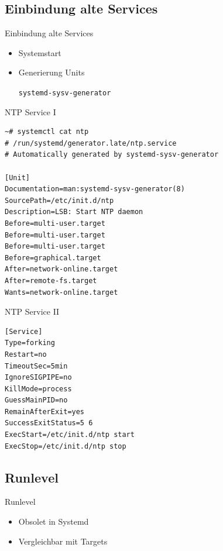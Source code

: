 \subsection{Einbindung alte Services}

\begin{frame}[fragile]{Einbindung alte Services}
  \begin{itemize}
    \item Systemstart
    \item Generierung Units

	    \verb|systemd-sysv-generator|
  \end{itemize}
\end{frame}

\begin{frame}[fragile]{NTP Service I}
\begin{lstlisting}
~# systemctl cat ntp
# /run/systemd/generator.late/ntp.service
# Automatically generated by systemd-sysv-generator

[Unit]
Documentation=man:systemd-sysv-generator(8)
SourcePath=/etc/init.d/ntp
Description=LSB: Start NTP daemon
Before=multi-user.target
Before=multi-user.target
Before=multi-user.target
Before=graphical.target
After=network-online.target
After=remote-fs.target
Wants=network-online.target
\end{lstlisting}
\end{frame}

\begin{frame}[fragile]{NTP Service II}
\begin{lstlisting}
[Service]
Type=forking
Restart=no
TimeoutSec=5min
IgnoreSIGPIPE=no
KillMode=process
GuessMainPID=no
RemainAfterExit=yes
SuccessExitStatus=5 6
ExecStart=/etc/init.d/ntp start
ExecStop=/etc/init.d/ntp stop
\end{lstlisting}
\end{frame}

\subsection{Runlevel}

\begin{frame}{Runlevel}
\begin{itemize}
\item Obsolet in Systemd
\item Vergleichbar mit Targets
\end{itemize}	
\end{frame}

